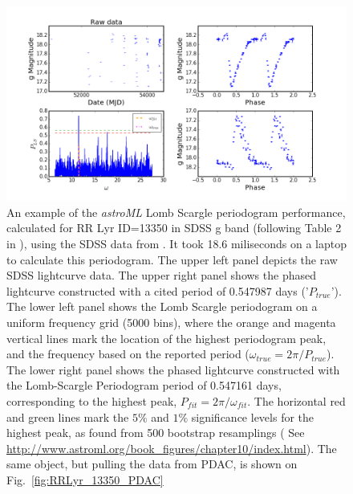 \documentclass[DM,lsstdraft,toc,usenatbib]{lsstdoc}
\begin{document}
\begin{figure}
\includegraphics[width=\textwidth]{figs/Fig_2_RRLyr_LS_periodogram_ID_13350_g}
\caption{ An example of the  {\it astroML} Lomb Scargle periodogram performance,  calculated for RR Lyr ID=13350  in SDSS g band (following Table 2 in \citep{sesar2010}), using the SDSS data from \citep{sesar2010}.  It took 18.6 miliseconds on a laptop to calculate this periodogram. The upper left panel depicts the raw  SDSS lightcurve data. The upper right panel shows the phased lightcurve constructed with a cited period of 0.547987 days ('$P_{true}$'). The lower left panel shows the Lomb Scargle periodogram on  a uniform frequency grid (5000 bins), where the orange and magenta vertical lines mark the location of the highest periodogram peak, and the frequency based on the reported period ($\omega_{true} = 2 \pi / P_{true}$). The lower right panel shows the phased lightcurve constructed with the Lomb-Scargle Periodogram period of 0.547161 days,  corresponding to the highest peak, $P_{fit} = 2 \pi / \omega_{fit}$. The horizontal red and green lines mark the $5\%$ and $1\%$  significance levels for the highest peak, as found from 500 bootstrap resamplings ( See \url{http://www.astroml.org/book\_figures/chapter10/index.html}). The same object, but pulling the data from PDAC, is shown on Fig.~\ref{fig:RRLyr_13350_PDAC} }
\label{fig:RRLyr_13350_Sesar}
\end{figure}
\end{document}
